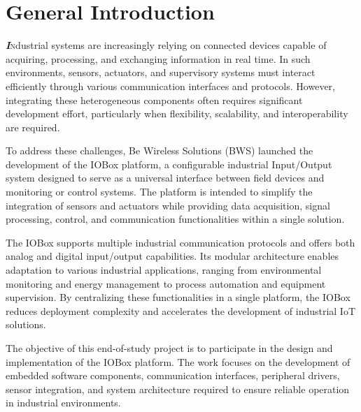 \clearpage
\pagestyle{empty}
\chapter*{{\emph\LARGE{General Introduction}}}


\pagestyle{fancy}
\fancyhf{}
\cfoot{\thepage}

\lettrine[lines=2,loversize=0.1]{\textbf{\textit{I}}} 
ndustrial systems are increasingly relying on connected devices capable of acquiring, processing, and exchanging information in real time. In such environments, sensors, actuators, and supervisory systems must interact efficiently through various communication interfaces and protocols. However, integrating these heterogeneous components often requires significant development effort, particularly when flexibility, scalability, and interoperability are required.

To address these challenges, Be Wireless Solutions (BWS) launched the development of the IOBox platform, a configurable industrial Input/Output system designed to serve as a universal interface between field devices and monitoring or control systems. The platform is intended to simplify the integration of sensors and actuators while providing data acquisition, signal processing, control, and communication functionalities within a single solution.

The IOBox supports multiple industrial communication protocols and offers both analog and digital input/output capabilities. Its modular architecture enables adaptation to various industrial applications, ranging from environmental monitoring and energy management to process automation and equipment supervision. By centralizing these functionalities in a single platform, the IOBox reduces deployment complexity and accelerates the development of industrial IoT solutions.

The objective of this end-of-study project is to participate in the design and implementation of the IOBox platform. The work focuses on the development of embedded software components, communication interfaces, peripheral drivers, sensor integration, and system architecture required to ensure reliable operation in industrial environments.\linebreak[4]


